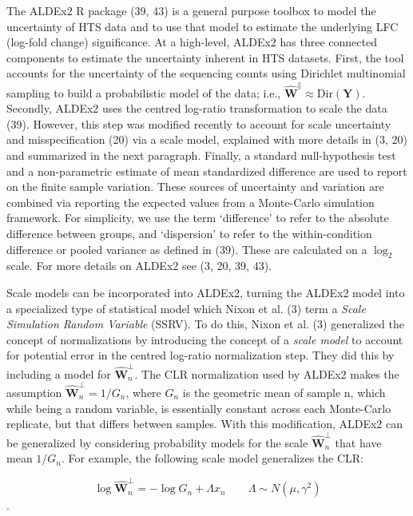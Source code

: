 \documentclass[
]{article}
\begin{document}
The ALDEx2 R package (39, 43) is a general purpose toolbox to model the
uncertainty of HTS data and to use that model to estimate the underlying
LFC (log-fold change) significance. At a high-level, ALDEx2 has three
connected components to estimate the uncertainty inherent in HTS
datasets. First, the tool accounts for the uncertainty of the sequencing
counts using Dirichlet multinomial sampling to build a probabilistic
model of the data; i.e.,
\(\mathbf{\hat{W}}^{\parallel} \approx \mathrm{Dir}(\mathbf{Y})\).
Secondly, ALDEx2 uses the centred log-ratio transformation to scale the
data (39). However, this step was modified recently to account for scale
uncertainty and misspecification (20) via a scale model, explained with
more details in (3, 20) and summarized in the next paragraph. Finally, a
standard null-hypothesis test and a non-parametric estimate of mean
standardized difference are used to report on the finite sample
variation. These sources of uncertainty and variation are combined via
reporting the expected values from a Monte-Carlo simulation framework.
For simplicity, we use the term `difference' to refer to the absolute
difference between groups, and `dispersion' to refer to the
within-condition difference or pooled variance as defined in (39). These
are calculated on a \(\log_2\) scale. For more details on ALDEx2 see (3,
20, 39, 43).

Scale models can be incorporated into ALDEx2, turning the ALDEx2 model
into a specialized type of statistical model which Nixon et al. (3) term
a \textit{Scale Simulation Random   Variable} (SSRV). To do this, Nixon
et al. (3) generalized the concept of normalizations by introducing the
concept of a \textit{scale model} to account for potential error in the
centred log-ratio normalization step. They did this by including a model
for \(\mathbf{\hat{W}}^{\perp}_{n}\). The CLR normalization used by
ALDEx2 makes the assumption \(\mathbf{\hat{W}}^{\perp}_{n}=1/G_{n}\),
where \(G_n\) is the geometric mean of sample n, which while being a
random variable, is essentially constant across each Monte-Carlo
replicate, but that differs between samples. With this modification,
ALDEx2 can be generalized by considering probability models for the
scale \(\mathbf{\hat{W}}^{\perp}_{n}\) that have mean \(1/G_{n}\). For
example, the following scale model generalizes the CLR:

\[\log \mathbf{\hat{W}}^{\perp}_{n} = -\log G_{n} + \Lambda x_{n} \qquad \Lambda
\sim N(\mu, \gamma^{2})\].
\end{document}
